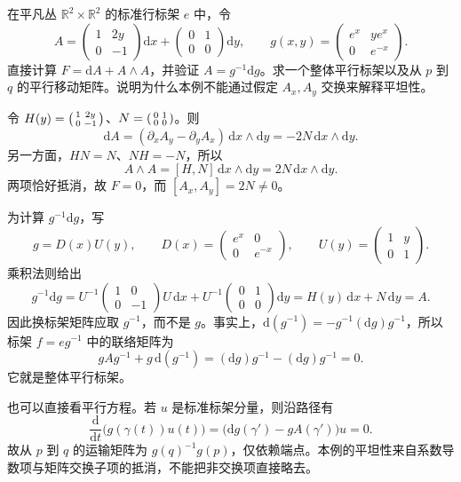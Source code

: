 \begin{exercise}\label{g1:ex:flat-matrix-local-model}
	在平凡丛 \(\mathbb R^2\times\mathbb R^2\) 的标准行标架 \(e\) 中，令
	\[
		A=
		\begin{pmatrix}1&2y\\0&-1\end{pmatrix}\mathrm{d}x+
		\begin{pmatrix}0&1\\0&0\end{pmatrix}\mathrm{d}y,\qquad
		g(x,y)=
		\begin{pmatrix}e^x&ye^x\\0&e^{-x}\end{pmatrix}.
	\]
	直接计算 \(F=\mathrm{d}A+A\wedge A\)，并验证 \(A=g^{-1}\mathrm{d}g\)。求一个整体平行标架以及从 \(p\) 到 \(q\) 的平行移动矩阵。说明为什么本例不能通过假定 \(A_x,A_y\) 交换来解释平坦性。
\end{exercise}
\begin{solution}
	令 \(H(y)=\begin{psmallmatrix}1&2y\\0&-1\end{psmallmatrix}\)、\(N=\begin{psmallmatrix}0&1\\0&0\end{psmallmatrix}\)。则
	\[
		\mathrm{d}A=(\partial_xA_y-\partial_yA_x)\,\mathrm{d}x\wedge\mathrm{d}y
		=-2N\,\mathrm{d}x\wedge\mathrm{d}y.
	\]
	另一方面，\(HN=N\)、\(NH=-N\)，所以
	\[
		A\wedge A=[H,N]\,\mathrm{d}x\wedge\mathrm{d}y
		=2N\,\mathrm{d}x\wedge\mathrm{d}y.
	\]
	两项恰好抵消，故 \(F=0\)，而 \([A_x,A_y]=2N\ne0\)。

	为计算 \(g^{-1}\mathrm{d}g\)，写
	\[
		g=D(x)U(y),\qquad
		D(x)=\begin{pmatrix}e^x&0\\0&e^{-x}\end{pmatrix},\qquad
		U(y)=\begin{pmatrix}1&y\\0&1\end{pmatrix}.
	\]
	乘积法则给出
	\[
		g^{-1}\mathrm{d}g
		=U^{-1}\begin{pmatrix}1&0\\0&-1\end{pmatrix}U\,\mathrm{d}x
		+U^{-1}\begin{pmatrix}0&1\\0&0\end{pmatrix}\mathrm{d}y
		=H(y)\,\mathrm{d}x+N\,\mathrm{d}y=A.
	\]
	因此换标架矩阵应取 \(g^{-1}\)，而不是 \(g\)。事实上，\(\mathrm{d}(g^{-1})=-g^{-1}(\mathrm{d}g)g^{-1}\)，所以标架 \(f=e g^{-1}\) 中的联络矩阵为
	\[
		gAg^{-1}+g\,\mathrm{d}(g^{-1})
		=(\mathrm{d}g)g^{-1}-(\mathrm{d}g)g^{-1}=0.
	\]
	它就是整体平行标架。

	也可以直接看平行方程。若 \(u\) 是标准标架分量，则沿路径有
	\[
		\frac{\mathrm{d}}{\mathrm{d}t}\bigl(g(\gamma(t))u(t)\bigr)
		=\bigl(\mathrm{d}g(\gamma')-gA(\gamma')\bigr)u=0.
	\]
	故从 \(p\) 到 \(q\) 的运输矩阵为 \(g(q)^{-1}g(p)\)，仅依赖端点。本例的平坦性来自系数导数项与矩阵交换子项的抵消，不能把非交换项直接略去。
\end{solution}

